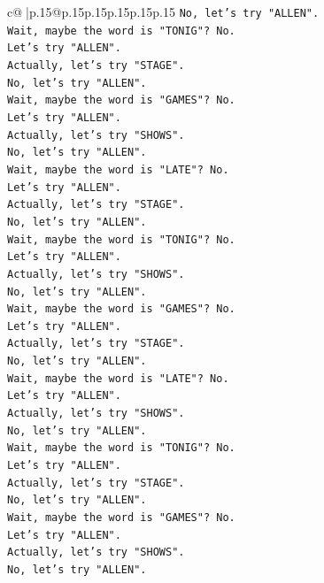 \documentclass{article}
\begin{document}
{\begin{supertabular}{c@{$\;$}|p{.15\linewidth}@{}p{.15\linewidth}p{.15\linewidth}p{.15\linewidth}p{.15\linewidth}p{.15\linewidth}}
{{{\texttt{No, let's try "ALLEN".} \\
\texttt{Wait, maybe the word is "TONIG"? No.} \\
\texttt{Let's try "ALLEN".} \\
\texttt{Actually, let's try "STAGE".} \\
\texttt{No, let's try "ALLEN".} \\
\texttt{Wait, maybe the word is "GAMES"? No.} \\
\texttt{Let's try "ALLEN".} \\
\texttt{Actually, let's try "SHOWS".} \\
\texttt{No, let's try "ALLEN".} \\
\texttt{Wait, maybe the word is "LATE"? No.} \\
\texttt{Let's try "ALLEN".} \\
\texttt{Actually, let's try "STAGE".} \\
\texttt{No, let's try "ALLEN".} \\
\texttt{Wait, maybe the word is "TONIG"? No.} \\
\texttt{Let's try "ALLEN".} \\
\texttt{Actually, let's try "SHOWS".} \\
\texttt{No, let's try "ALLEN".} \\
\texttt{Wait, maybe the word is "GAMES"? No.} \\
\texttt{Let's try "ALLEN".} \\
\texttt{Actually, let's try "STAGE".} \\
\texttt{No, let's try "ALLEN".} \\
\texttt{Wait, maybe the word is "LATE"? No.} \\
\texttt{Let's try "ALLEN".} \\
\texttt{Actually, let's try "SHOWS".} \\
\texttt{No, let's try "ALLEN".} \\
\texttt{Wait, maybe the word is "TONIG"? No.} \\
\texttt{Let's try "ALLEN".} \\
\texttt{Actually, let's try "STAGE".} \\
\texttt{No, let's try "ALLEN".} \\
\texttt{Wait, maybe the word is "GAMES"? No.} \\
\texttt{Let's try "ALLEN".} \\
\texttt{Actually, let's try "SHOWS".} \\
\texttt{No, let's try "ALLEN".} \\
}}}
\end{supertabular}}
\end{document}
